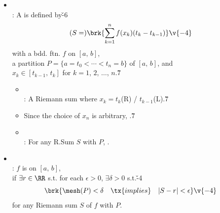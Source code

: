 \documentclass[dvipdfmx,a4paper,titlepage,9pt]{jsarticle}
\begin{document}
\begin{multicols*}{2}
\begin{itemize}[label={-}]
\begin{Pfbox}[($\Longto$)]
(ii) If $|Q|-|P|\lqs 1$, then $|Q|\lqs |P|+(m-1)$,\\
by (i) and the inductive argument, we have\\
$L(f,\,Q)-L(f,\,P)<2B(m-1)\delta=\epsilon/4$.\hfill$\cdots\cdots\;(2)$\v4

Since $P_0\subseteq Q$, $L(f,\,P_0)\lqs L(f,\,Q)$, thus
$L(f,\,P_0)-L(f,\,P)\lqs L(f,\,Q)-L(f,\,P)<\epsilon/4$.\hfill$\cdots\cdots\;(3)$\v4

Similarly, we can derive\v{-4}
$$\min{}\{U(f,\,P)-U(f,\,Q),\,U(f,\,P)-U(f,\,P_0)\}<\epsilon/4\tx.\v{-6}$$
\hfill$\cdots\cdots\;(4)$\v4

By $(1)$-$(4)$, we conclude\v{-4}
$$\begin{aligned}
U(f,\,P)-L(f,\,P)&<U(f,\,P_0)+\epsilon/4-L(f,\,P_0)+\epsilon/4\\
&=U(f,\,P_0)-L(f,\,P_0)+\epsilon/2\\
&<\epsilon/2+\epsilon/2=\epsilon\tx.
\end{aligned}\v{-19.8}$$
\end{Pfbox}

\newpage

\item{}\\
: A  is defined by\v{-6}
$$(S=)\brk{\sum_{k=1}^nf(x_k)(t_k-t_{k-1})}\v{-4}$$
\;\;with a bdd. ftn. $f$ on $[a,\,b]$,\\
\;\;a partition $P=\{a=t_0<\cdots<t_n=b\}$ of $[a,\,b]$, and\\
\;\;$x_k\in[t_{k-1},\,t_k]$ for $k=1$, $2$, $\ldots$, $n$.\v7

\begin{itemize}[label=\Cdot]
\setlength{\leftskip}{-10pt}
\item{}\\
: A Riemann sum where $x_k=t_k$(R) / $t_{k-1}$(L).\v7

\item Since the choice of $x_n$ is arbitrary, .\v7

\item{}\\
: For any R.Sum $S$ with $P$, .\\
\end{itemize}

\item{}\\
: $f$ is  on $[a,\,b]$,\\
\;\;if $\exists r\in\RR$ s.t. for each $\epsilon>0$, $\exists\delta>0$ s.t.\v{-4}
$$\brk{\mesh(P)<\delta\quad\tx{implies}\quad |S-r|<\epsilon}\v{-4}$$
\;\;for any Riemann sum $S$ of $f$ with $P$.\\


\end{itemize}
\end{multicols*}
\end{document}
